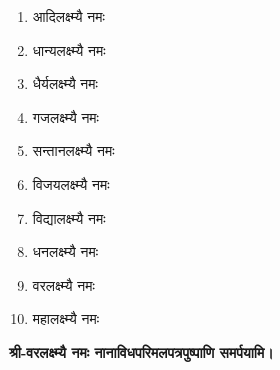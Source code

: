 
\begin{multicols}{2}
\begin{enumerate}
\item आदिलक्ष्म्यै नमः
\item धान्यलक्ष्म्यै नमः
\item धैर्यलक्ष्म्यै नमः
\item गजलक्ष्म्यै नमः
\item सन्तानलक्ष्म्यै नमः
\item विजयलक्ष्म्यै नमः
\item विद्यालक्ष्म्यै नमः
\item धनलक्ष्म्यै नमः
\item वरलक्ष्म्यै नमः
\item महालक्ष्म्यै नमः 
\end{enumerate}
\end{multicols}



\begingroup
\centering
\setlength{\columnseprule}{1pt}
\let\chapt\sect


\textbf{श्री-वरलक्ष्म्यै नमः नानाविध\-परिमल\-पत्रपुष्पाणि समर्पयामि।}

\endgroup

